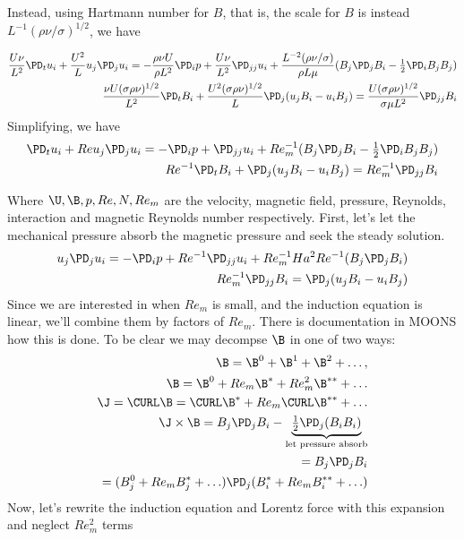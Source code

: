\documentclass[11pt]{article}
\begin{document}
Instead, using Hartmann number for $B$, that is, the scale for $B$ is instead $L^{-1} (\rho \nu / \sigma)^{1/2}$, we have

\begin{equation}\begin{aligned}
\frac{U \nu}{L^2} \PD_t u_i+ \frac{U^2}{L} u_j\PD_j u_i =-\frac{\rho \nu U}{\rho L^2}\PD_i p+ \frac{U \nu}{L^2} \PD_{jj} u_i + \frac{L^{-2} (\rho \nu / \sigma)}{\rho L \mu} (B_j \PD_j B_i - \tfrac{1}{2} \PD_i B_j B_j) \\
\frac{\nu U (\sigma \rho \nu)^{1/2}}{L^2} \PD_t B_i + \frac{U^2 (\sigma \rho \nu)^{1/2}}{L} \PD_j (u_j B_i - u_i B_j) = \frac{U (\sigma \rho \nu)^{1/2}}{\sigma \mu L^2} \PD_{jj} B_i
\end{aligned} \end{equation}
Simplifying, we have
\begin{equation}\begin{aligned}
\PD_t u_i+ Re u_j\PD_j u_i =-\PD_i p+ \PD_{jj} u_i + Re_m^{-1} (B_j \PD_j B_i - \tfrac{1}{2} \PD_i B_j B_j) \\
Re^{-1} \PD_t B_i + \PD_j (u_j B_i - u_i B_j) = Re_m^{-1} \PD_{jj} B_i
\end{aligned} \end{equation}

Where $\U,\B,p,Re,N,Re_m$ are the velocity, magnetic field, pressure, Reynolds, interaction and magnetic Reynolds number respectively. First, let's let the mechanical pressure absorb the magnetic pressure and seek the steady solution.
\begin{equation}\begin{aligned}
u_j\PD_j u_i =-\PD_i p+ Re^{-1} \PD_{jj} u_i + Re_m^{-1} Ha^2 Re^{-1} (B_j \PD_j B_i) \\
Re_m^{-1} \PD_{jj} B_i = \PD_j (u_j B_i - u_i B_j)
\end{aligned} \end{equation}
Since we are interested in when $Re_m$ is small, and the induction equation is linear, we'll combine them by factors of $Re_m$. There is documentation in MOONS how this is done. To be clear we may decompse $\B$ in one of two ways:
\begin{equation}\begin{aligned}
	\B = \B^0 + \B^1 + \B^2 + \hdots , \\
	\B = \B^0 + Re_m \B^* + Re_m^2 \B^{**} + \hdots \\
	\J = \CURL \B = \CURL \B^* + Re_m \CURL \B^{**} + \hdots \\
	\J \times \B = B_j \PD_j B_i - \underbrace{\tfrac{1}{2} \PD_j (B_i B_i)}_{\text{let pressure absorb}} \\
	= B_j \PD_j B_i \\
	= (B_j^0+Re_m B_j^* + \hdots) \PD_j (B_i^*+Re_m B_i^{**} + \hdots) \\
\end{aligned} \end{equation}
Now, let's rewrite the induction equation and Lorentz force with this expansion and neglect $Re_m^2$ terms
\end{document}
